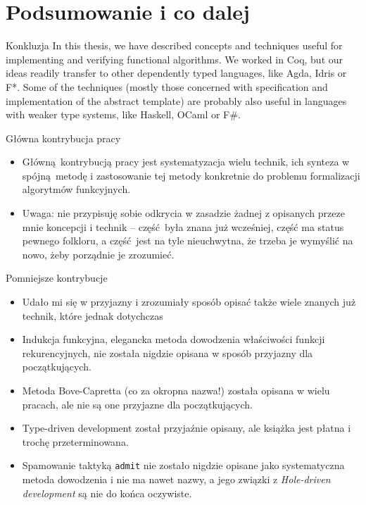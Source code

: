 \documentclass{beamer}
\begin{document}
\section{Podsumowanie i co dalej}


\begin{frame}{Konkluzja}
	In this thesis, we have described concepts and techniques useful for implementing and verifying functional algorithms. We worked in Coq, but our ideas readily transfer to other dependently typed languages, like Agda, Idris or F*. Some of the techniques (mostly those concerned with specification and implementation of the abstract template) are probably also useful in languages with weaker type systems, like Haskell, OCaml or F\#.
\end{frame}

\begin{frame}{Główna kontrybucja pracy}
\begin{itemize}
	\item Główną kontrybucją pracy jest systematyzacja wielu technik, ich synteza w spójną metodę i zastosowanie tej metody konkretnie do problemu formalizacji algorytmów funkcyjnych.
	\item Uwaga: nie przypisuję sobie odkrycia w zasadzie żadnej z opisanych przeze mnie koncepcji i technik -- część była znana już wcześniej, część ma status pewnego folkloru, a część jest na tyle nieuchwytna, że trzeba je wymyślić na nowo, żeby porządnie je zrozumieć.
\end{itemize}
\end{frame}

\begin{frame}{Pomniejsze kontrybucje}
\begin{itemize}
	\item Udało mi się w przyjazny i zrozumiały sposób opisać także wiele znanych już technik, które jednak dotychczas 
	\item Indukcja funkcyjna, elegancka metoda dowodzenia właściwości funkcji rekurencyjnych, nie została nigdzie opisana w sposób przyjazny dla początkujących.
	\item Metoda Bove-Capretta (co za okropna nazwa!) została opisana w wielu pracach, ale nie są one przyjazne dla początkujących.
	\item Type-driven development został przyjaźnie opisany, ale książka jest płatna i trochę przeterminowana.
	\item Spamowanie taktyką \texttt{admit} nie zostało nigdzie opisane jako systematyczna metoda dowodzenia i nie ma nawet nazwy, a jego związki z \textit{Hole-driven development} są nie do końca oczywiste.
\end{itemize}
\end{frame}
\end{document}

